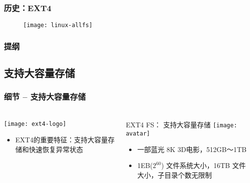 \begin{frame}[fragile]
	\frametitle{历史：EXT4}
	\begin{figure}
		\texttt{[image: linux-allfs]}
	\end{figure}

\end{frame}



\begin{frame}
\frametitle{提纲} %
\tableofcontents %
\end{frame}
\subsection{支持大容量存储}
\begin{frame}[fragile]
	\frametitle{细节 -- 支持大容量存储}
	
	\frametitle{ }
	\begin{columns}[t]
		\begin{column}{.3\textwidth}
			
			\texttt{[image: ext4-logo]}
			\begin{itemize}
				\item EXT4的重要特征：支持大容量存储和快速恢复异常状态
				
			\end{itemize}
			
		\end{column}
		
		\begin{column}{.7\textwidth}			
			EXT4 FS： 支持大容量存储
			\texttt{[image: avatar]}
			\begin{itemize}
				\item 一部蓝光 8K 3D电影，512GB～1TB
				\item 1EB($2^{60}$) 文件系统大小，16TB 文件大小，子目录个数无限制
			\end{itemize}
			
		\end{column}
	\end{columns}
	
\end{frame}


